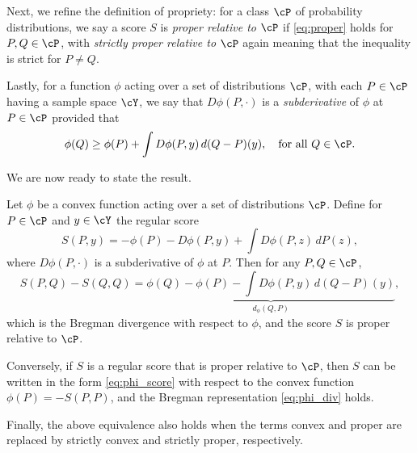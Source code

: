 \documentclass{article}
\begin{document}
Next, we refine the definition of propriety: for a class $\cP$ of probability
distributions, we say a score $S$ is \emph{proper relative to $\cP$} if
\eqref{eq:proper} holds for $P,Q \in \cP$, with \emph{strictly proper relative 
  to $\cP$} again meaning that the inequality is strict for $P \not= Q$.  

Lastly, for a function $\phi$ acting over a set of distributions $\cP$, with
each $P \in \cP$ having a sample space $\cY$, we say that $D\phi(P, \cdot)$ is a
\emph{subderivative} of $\phi$ at $P \in \cP$ provided that 
\begin{equation}
\label{eq:subderiv}
\phi(Q) \geq \phi(P) + \int D\phi(P, y) \, d(Q-P)(y), \quad \text{for all $Q \in
  \cP$}.  
\end{equation}

We are now ready to state the result. 

\begin{theorem}
Let $\phi$ be a convex function acting over a set of distributions $\cP$. Define
for $P \in \cP$ and $y \in \cY$ the regular score  
\begin{equation}
\label{eq:phi_score}
S(P, y) = -\phi(P) - D\phi(P, y) + \int D\phi(P, z) \, dP(z),
\end{equation}
where $D\phi(P, \cdot)$ is a subderivative of $\phi$ at $P$. Then for any $P,Q
\in \cP$, 
\begin{equation}
\label{eq:phi_div}
S(P, Q) - S(Q, Q) = \underbrace{\phi(Q) - \phi(P) - \int D\phi(P, y) \,
  d(Q-P)(y)}_{d_\phi(Q,P)},
\end{equation}
which is the Bregman divergence with respect to $\phi$, and the score $S$ is
proper relative to $\cP$.  

Conversely, if $S$ is a regular score that is proper relative to $\cP$, then $S$
can be written in the form \eqref{eq:phi_score} with respect to the convex
function $\phi(P) = -S(P, P)$, and the Bregman representation \eqref{eq:phi_div}
holds.    

Finally, the above equivalence also holds when the terms convex and proper are
replaced by strictly convex and strictly proper, respectively.  
\end{theorem}
\end{document}
